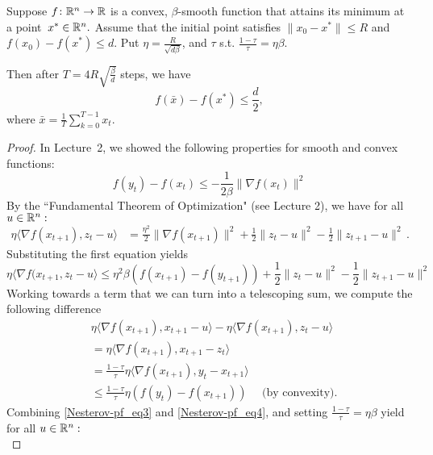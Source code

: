 \begin{lemma}
Suppose $f\colon\mathbb{R}^n\to\mathbb{R}$ is a convex, $\beta$-smooth function that attains its
minimum at a point~$x^*\in\mathbb{R}^n.$
Assume that the initial point satisfies $\|x_0-x^*\|\le R$ and $f(x_0)-f(x^*)\le
d.$ Put $\eta = \frac{R}{\sqrt{d\beta}}$, and 
$\tau$ s.t. $\frac{1-\tau}{\tau} = \eta \beta$.

Then after $T = 4R\sqrt{\frac{\beta}{d}}$ steps, 
we have 
\[
f(\bar{x})- f(x^*) \leq \frac{d}{2},
\]
where $\bar{x} = \frac{1}{T} \sum_{k=0}^{T-1} x_t$.
\end{lemma}

\begin{proof}
In Lecture~2, we showed the following properties for smooth and convex
functions:
\begin{equation}
\label{Nesterov-pf_smoothness_and_convexity}
f(y_t) - f(x_t) \leq -\frac{1}{2 \beta} \|\nabla f(x_t) \|^2
\end{equation}
By the ``Fundamental Theorem of Optimization" (see Lecture 2), we have
for all $u\in\mathbb{R}^n:$
\begin{align}
\label{lecture7-nonsmooth}
\eta\langle \nabla f(x_{t+1}), z_t - u \rangle 
&= \frac{\eta^2}2\|\nabla f(x_{t+1})\|^2 
+ \frac12\|z_t - u \|^2 - \frac12\|z_{t+1} - u \|^2\,.
\end{align}
Substituting the first equation yields
\begin{equation}
\eta \langle \nabla f(x_{t+1}, z_t - u \rangle \leq \eta^2 \beta (f(x_{t+1}) -
f(y_{t+1})) + \frac12\|z_t - u\|^2 - \frac12\|z_{t+1} - u \|^2 \label{Nesterov-pf_eq3}
\end{equation}
\medskip
Working towards a term that we can turn into a telescoping sum, we compute the
following difference
\begin{align}
&\eta \langle \nabla f(x_{t+1}), x_{t+1} - u\rangle - \eta \langle \nabla
f(x_{t+1}), z_t - u\rangle \nonumber\\
&= \eta \langle\nabla f(x_{t+1}), x_{t+1} - z_t\rangle \nonumber\\
&= \frac{1-\tau}{\tau}  \eta \langle\nabla f(x_{t+1}), y_t - x_{t+1}\rangle \nonumber\\
&\leq \frac{1-\tau}{\tau} \eta (f(y_t) - f(x_{t+1})) \quad\text{ (by convexity)}. \label{Nesterov-pf_eq4}
\end{align}
\medskip
Combining  \eqref{Nesterov-pf_eq3} and \eqref{Nesterov-pf_eq4}, and setting
$\frac{1-\tau}{\tau} = \eta \beta$ yield for all $u\in\mathbb{R}^n:$
\begin{equation*}

\end{equation*}
\end{proof}
